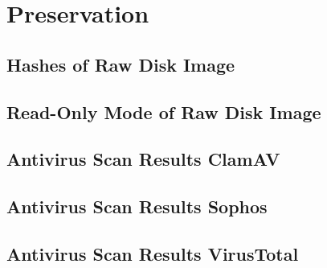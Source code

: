 \documentclass[./main.tex]{subfiles}
\begin{document}
\section{Preservation}
\subsection{Hashes of Raw Disk Image}
\label{app:hashes}
\lipsum
\pagebreak
\subsection{Read-Only Mode of Raw Disk Image}
\label{app:read_only}
\lipsum
\pagebreak
\subsection{Antivirus Scan Results ClamAV}
\label{app:malware_clamav}
\lipsum
\pagebreak
\subsection{Antivirus Scan Results Sophos}
\label{app:malware_sophos}
\lipsum
\pagebreak
\subsection{Antivirus Scan Results VirusTotal}
\label{app:malware_virustotal}
\lipsum
\pagebreak
\end{document}
